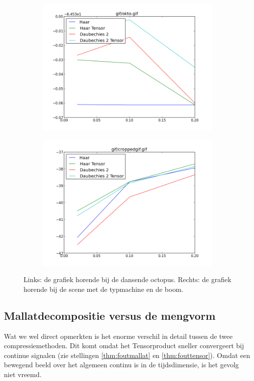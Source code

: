 \begin{figure}[h]
\centering
\begin{subfigure}[t]{0.48\textwidth}
\includegraphics[width=\linewidth]{plaatjes/cockto.png}
\end{subfigure}
\begin{subfigure}[t]{0.48\textwidth}
\includegraphics[width=\linewidth]{plaatjes/croppedgif.png}
\end{subfigure}
\caption{Links: de grafiek horende bij de dansende octopus. Rechts: de grafiek horende bij de scene met de typmachine en de boom.}
\label{fig:cockto}
\end{figure}

\subsection{Mallatdecompositie versus de mengvorm}
Wat we wel direct opmerkten is het enorme verschil in detail tussen de twee compressiemethoden. 
Dit komt omdat het Tensorproduct sneller convergeert bij continue signalen 
(zie stellingen \ref{thm:foutmallat} en \ref{thm:fouttensor}). 
Omdat een bewegend beeld over het algemeen continu is in de tijdsdimensie, is het gevolg niet vreemd.

